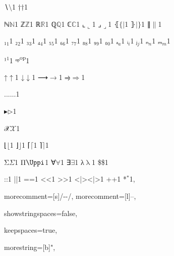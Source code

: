 {{∖}{{\color{symbolcolor}\ensuremath{\setminus}}}1
{†}{{\color{symbolcolor}\ensuremath{\dag}}}1

{ℕ}{{\ensuremath{\mathbb{N}}}}1
{ℤ}{{\ensuremath{\mathbb{Z}}}}1
{ℝ}{{\ensuremath{\mathbb{R}}}}1
{ℚ}{{\ensuremath{\mathbb{Q}}}}1
{ℂ}{{\ensuremath{\mathbb{C}}}}1
{⌞}{{\ensuremath{\llcorner}}}1
{⌟}{{\ensuremath{\lrcorner}}}1
{⦃}{{\ensuremath{\{\!|}}}1
{⦄}{{\ensuremath{|\!\}}}}1
{∥}{{\ensuremath{\|}}}1

{₁}{{\ensuremath{_1}}}1
{₂}{{\ensuremath{_2}}}1
{₃}{{\ensuremath{_3}}}1
{₄}{{\ensuremath{_4}}}1
{₅}{{\ensuremath{_5}}}1
{₆}{{\ensuremath{_6}}}1
{₇}{{\ensuremath{_7}}}1
{₈}{{\ensuremath{_8}}}1
{₉}{{\ensuremath{_9}}}1
{₀}{{\ensuremath{_0}}}1
{ₐ}{{\ensuremath{_a}}}1
{ᵢ}{{\ensuremath{_i}}}1
{ⱼ}{{\ensuremath{_j}}}1
{ₙ}{{\ensuremath{_n}}}1
{ₘ}{{\ensuremath{_m}}}1

{¹}{{\ensuremath{^1}}}1
{ᵒᵖ}{{\color{symbolcolor}\textsuperscript{op}}}1

{↑}{{\color{symbolcolor}\ensuremath{\uparrow}}}1
{↓}{{\color{symbolcolor}\ensuremath{\downarrow}}}1
{⟶}{{\color{symbolcolor}\ensuremath{\longrightarrow}}}1
{⥤}{{\color{symbolcolor}\ensuremath{\Rightarrow}}}1

{...}{{\ensuremath{\ldots}}}1

{▸}{{\ensuremath{\triangleright}}}1

{𝒳}{{\ensuremath{\mathcal{X}}}}1

{⌊}{{\ensuremath{\lfloor}}}1
{⌋}{{\ensuremath{\rfloor}}}1
{⌈}{{\ensuremath{\lceil}}}1
{⌉}{{\ensuremath{\rceil}}}1

{Σ}{{\color{symbolcolor}\ensuremath{\Sigma}}}1
{Π}{{\color{symbolcolor}\ensuremath{\mathrm{\Uppi}}}}1 %
{∀}{{\color{symbolcolor}\ensuremath{\forall}}}1
{∃}{{\color{symbolcolor}\ensuremath{\exists}}}1
{λ}{{\color{symbolcolor}\ensuremath{\mathrm{\uplambda}}}}1
{\$}{{\color{symbolcolor}\$}}1

{:}{{\color{symbolcolor}:}}1
{|}{{\color{symbolcolor}|}}1
{=}{{\color{symbolcolor}=}}1
{<}{{\color{symbolcolor}<}}1
{>}{{\color{symbolcolor}>}}1
{<|>}{{\color{symbolcolor}<|>}}1
{+}{{\color{symbolcolor}+}}1
{*}{{\color{symbolcolor}\ensuremath{{}^{*}}}}1,

morecomment=[s]{/-}{-/},
morecomment=[l]{--},

showstringspaces=false,

keepspaces=true,

morestring=[b]{"},

}
